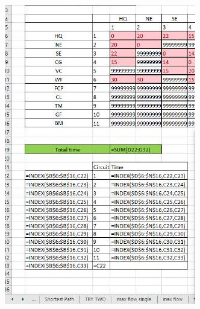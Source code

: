 \documentclass[10pt]{article}
\begin{document}
\includegraphics[max width=\textwidth]{2022_07_05_5945264bba2a5f6ba667g-58(4)}
\end{document}

